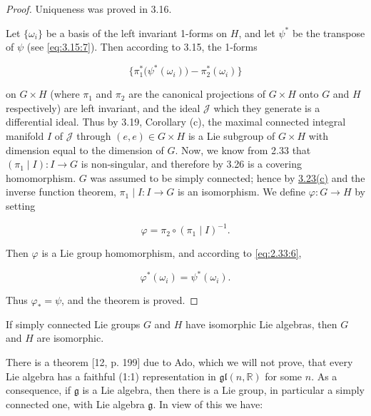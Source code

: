 \begin{proof}
Uniqueness was proved in 3.16.

Let $\{\omega_i\}$ be a basis of the left invariant 1-forms on $H$, and let $\psi^*$ be the transpose of $\psi$ (see \eqref{eq:3.15:7}). Then according to 3.15, the 1-forms

\begin{equation}
\tag{1}\label{eq:3.27:1}
\{\pi_{1}^{*}\big(\psi^{*}(\omega_{i})\big)-\pi_{2}^{*}(\omega_{i})\}
\end{equation}

on $G \times H$ (where $\pi_1$ and $\pi_2$ are the canonical projections of $G \times H$ onto $G$ and $H$ respectively) are left invariant, and the ideal $\mathcal{J}$ which they generate is a differential ideal. Thus by 3.19, Corollary (c), the maximal connected integral manifold $I$ of $\mathcal{J}$ through $(e,e) \in G \times H$ is a Lie subgroup of $G \times H$ with dimension equal to the dimension of $G$. Now, we know from 2.33 that $(\pi_1 \mid I): I \to G$ is non-singular, and therefore by 3.26 is a covering homomorphism. $G$ was assumed to be simply connected; hence by \hyperref[thm:3.23]{3.23(c)} and the inverse function theorem, $\pi_1 \mid I: I \to G$ is an isomorphism. We define $\varphi: G \to H$ by setting

\begin{equation}
\tag{2}\label{eq:3.27:2}
\varphi=\pi_{2}\circ(\pi_{1}\mid I)^{-1}.
\end{equation}

Then $\varphi$ is a Lie group homomorphism, and according to \eqref{eq:2.33:6},

\[
\varphi^{*}(\omega_{i})=\psi^{*}(\omega_{i}).
\]

Thus $\varphi_{*}=\psi$, and the theorem is proved.

\end{proof}

\begin{corollary*}
If simply connected Lie groups $G$ and $H$ have isomorphic Lie algebras, then $G$ and $H$ are isomorphic.
\end{corollary*}

There is a theorem [12, p. 199] due to Ado, which we will not prove, that every Lie algebra has a faithful (1:1) representation in $\mathfrak{gl}(n,\mathbb{R})$ for some $n$. As a consequence, if $\mathfrak{g}$ is a Lie algebra, then there is a Lie group, in particular a simply connected one, with Lie algebra $\mathfrak{g}$. In view of this we have:

